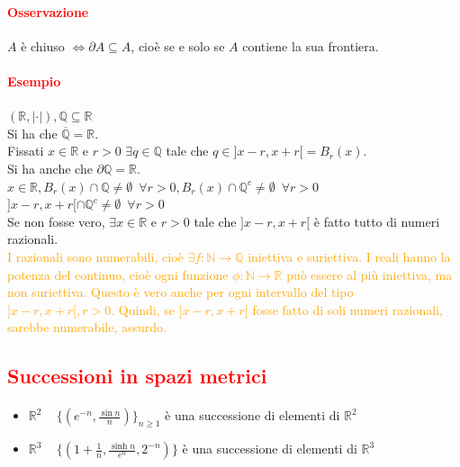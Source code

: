 \documentclass{article}
\newcommand{\R}{\mathbb{R}}
\newcommand{\Q}{\mathbb{Q}}
\newcommand{\N}{\mathbb{N}}
\begin{document}
\paragraph{\textcolor{red}{Osservazione}}
$A$ è chiuso $\Leftrightarrow \partial A \subseteq A$, cioè se e solo se $A$ contiene la sua frontiera.

\paragraph{\textcolor{red}{Esempio}}
$(\R, |\cdot|), \Q \subseteq \R$\\
Si ha che $\overline{\Q}=\R$.\\
Fissati $x\in \R$ e $ r>0 $ $ \exists q \in \Q $ tale che $ q\in ]x-r,x+r[=B_r(x)$.\\
Si ha anche che $\partial \Q = \R$.\\
$x \in \R, B_r(x)\cap \Q \neq \emptyset \,\,\, \forall r>0, B_r(x)\cap \Q^c \neq \emptyset \,\,\, \forall r >0 $\\
$]x-r,x+r[\cap \Q^c \neq \emptyset \,\,\, \forall r>0$\\
Se non fosse vero, $\exists x \in \R$ e $r>0$ tale che $]x-r,x+r[$ è fatto tutto di numeri razionali.\\
\textcolor{orange}{I razionali sono numerabili, cioè $\exists f: \N\rightarrow \Q $ iniettiva e suriettiva. I reali hanno la potenza del continuo, cioè ogni funzione $\phi:\N\rightarrow\R$ può essere al più iniettiva, ma non suriettiva. Questo è vero anche per ogni intervallo del tipo $]x-r,x+r[, r>0$. Quindi, se $]x-r,x+r[$ fosse fatto di soli numeri razionali, sarebbe numerabile, assurdo.}

\subsection{\textcolor{red}{Successioni in spazi metrici}}
\paragraph{}
\begin{itemize}
    \item $\R^2\,\,\,\,\,\,\, \{(e^{-n}, \frac{\sin n}{n}) \}_{n\geq 1}$ è una successione di elementi di $\R^2$
    \item $\R^3\,\,\,\,\,\,\, \{ (1+\frac{1}{n}, \frac{\sinh n}{e^n},2^{-n}) \}$ è una successione di elementi di $\R^3$
\end{itemize}
\end{document}
